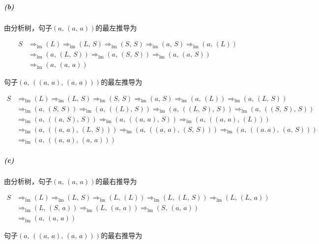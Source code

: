\documentclass{article}
\begin{document}
\subparagraph{(b)}
由分析树，句子$(a,\,(a,\,a))$的最左推导为

\begin{align*}
    S &\Rightarrow_{\text{lm}} (L) \Rightarrow_{\text{lm}} (L,\,S) \Rightarrow_{\text{lm}} (S,\,S) \Rightarrow_{\text{lm}} (a,\,S) \Rightarrow_{\text{lm}} (a,\,(L)) \\
    &\Rightarrow_{\text{lm}} (a,\,(L,\,S))
    \Rightarrow_{\text{lm}} (a,\,(S,\,S)) \Rightarrow_{\text{lm}} (a,\,(a,\,S)) \\
    &\Rightarrow_{\text{lm}} (a,\,(a,\,a))
\end{align*}

句子$(a,\,((a,\,a),\,(a,\,a)))$的最左推导为

\begin{align*}
    S &\Rightarrow_{\text{lm}} (L) \Rightarrow_{\text{lm}} (L,\,S) \Rightarrow_{\text{lm}} (S,\,S) \Rightarrow_{\text{lm}} (a,\,S) \Rightarrow_{\text{lm}} (a,\,(L)) \Rightarrow_{\text{lm}} (a,\,(L,\,S)) \\
    &\Rightarrow_{\text{lm}} (a,\,(S,\,S)) \Rightarrow_{\text{lm}} (a,\,((L),\,S)) \Rightarrow_{\text{lm}} (a,\,((L,\,S),\,S)) \Rightarrow_{\text{lm}} (a,\,((S,\,S),\,S)) \\
    &\Rightarrow_{\text{lm}} (a,\,((a,\,S),\,S))
    \Rightarrow_{\text{lm}} (a,\,((a,\,a),\,S)) \Rightarrow_{\text{lm}} (a,\,((a,\,a),\,(L))) \\
    &\Rightarrow_{\text{lm}} (a,\,((a,\,a),\,(L,\,S)))
    \Rightarrow_{\text{lm}} (a,\,((a,\,a),\,(S,\,S))) \Rightarrow_{\text{lm}} (a,\,((a.\,a),\,(a,\,S))) \\
    &\Rightarrow_{\text{lm}} (a,\,((a,\,a),\,(a,\,a)))
\end{align*}

\subparagraph{(c)}
由分析树，句子$(a,\,(a,\,a))$的最右推导为

\begin{align*}
    S &\Rightarrow_{\text{lm}} (L) \Rightarrow_{\text{lm}} (L,\,S) \Rightarrow_{\text{lm}} (L,\,(L)) \Rightarrow_{\text{lm}} (L,\,(L,\,S)) \Rightarrow_{\text{lm}} (L,\,(L,\,a)) \\
    &\Rightarrow_{\text{lm}} (L,\,(S,\,a))
    \Rightarrow_{\text{lm}} (L,\,(a,\,a)) \Rightarrow_{\text{lm}} (S,\,(a,\,a)) \\
    &\Rightarrow_{\text{lm}} (a,\,(a,\,a))
\end{align*}

句子$(a,\,((a,\,a),\,(a,\,a)))$的最右推导为
\end{document}
